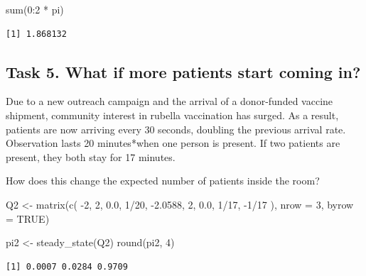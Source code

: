 \documentclass[
]{article}
\newenvironment{Shaded}{\begin{snugshade}}{\end{snugshade}}
\newcommand{\AttributeTok}[1]{\textcolor[rgb]{0.40,0.45,0.13}{#1}}
\newcommand{\ConstantTok}[1]{\textcolor[rgb]{0.56,0.35,0.01}{#1}}
\newcommand{\DecValTok}[1]{\textcolor[rgb]{0.68,0.00,0.00}{#1}}
\newcommand{\FloatTok}[1]{\textcolor[rgb]{0.68,0.00,0.00}{#1}}
\newcommand{\FunctionTok}[1]{\textcolor[rgb]{0.28,0.35,0.67}{#1}}
\newcommand{\NormalTok}[1]{\textcolor[rgb]{0.00,0.23,0.31}{#1}}
\newcommand{\OtherTok}[1]{\textcolor[rgb]{0.00,0.23,0.31}{#1}}
\newcommand{\SpecialCharTok}[1]{\textcolor[rgb]{0.37,0.37,0.37}{#1}}
\begin{document}
\begin{Shaded}
\begin{Highlighting}[]
\FunctionTok{sum}\NormalTok{(}\DecValTok{0}\SpecialCharTok{:}\DecValTok{2} \SpecialCharTok{*}\NormalTok{ pi)}
\end{Highlighting}
\end{Shaded}

\begin{verbatim}
[1] 1.868132
\end{verbatim}

\subsection{Task 5. What if more patients start coming
in?}\label{task-5.-what-if-more-patients-start-coming-in}

Due to a new outreach campaign and the arrival of a donor-funded vaccine
shipment, community interest in rubella vaccination has surged. As a
result, patients are now arriving every 30 seconds, doubling the
previous arrival rate. Observation lasts 20 minutes*when one person is
present. If two patients are present, they both stay for 17 minutes.

How does this change the expected number of patients inside the room?

\begin{Shaded}
\begin{Highlighting}[]
\NormalTok{Q2 }\OtherTok{\textless{}{-}} \FunctionTok{matrix}\NormalTok{(}\FunctionTok{c}\NormalTok{(}
  \SpecialCharTok{{-}}\DecValTok{2}\NormalTok{, }\DecValTok{2}\NormalTok{, }\FloatTok{0.0}\NormalTok{,}
   \DecValTok{1}\SpecialCharTok{/}\DecValTok{20}\NormalTok{, }\SpecialCharTok{{-}}\FloatTok{2.0588}\NormalTok{, }\DecValTok{2}\NormalTok{,}
   \FloatTok{0.0}\NormalTok{, }\DecValTok{1}\SpecialCharTok{/}\DecValTok{17}\NormalTok{, }\SpecialCharTok{{-}}\DecValTok{1}\SpecialCharTok{/}\DecValTok{17}
\NormalTok{), }\AttributeTok{nrow =} \DecValTok{3}\NormalTok{, }\AttributeTok{byrow =} \ConstantTok{TRUE}\NormalTok{)}

\NormalTok{pi2 }\OtherTok{\textless{}{-}} \FunctionTok{steady\_state}\NormalTok{(Q2)}
\FunctionTok{round}\NormalTok{(pi2, }\DecValTok{4}\NormalTok{)}
\end{Highlighting}
\end{Shaded}

\begin{verbatim}
[1] 0.0007 0.0284 0.9709
\end{verbatim}
\end{document}
